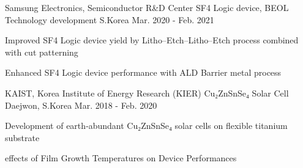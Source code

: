 \begin{cventries}
  \cventry
    {Samsung Electronics, Semiconductor R\&D Center} %
    {SF4 Logic device, BEOL Technology development} %
    {S.Korea} %
    {Mar. 2020 - Feb. 2021} %
    {
      \begin{cvitems} %
        \item {Improved SF4 Logic device yield by Litho–Etch–Litho–Etch process combined with cut patterning}
        \item {Enhanced SF4 Logic device performance with ALD Barrier metal process}
      \end{cvitems}
    }

  \cventry
    {KAIST, Korea Institute of Energy Research (KIER)} %
    {Cu₂ZnSnSe₄ Solar Cell} %
    {Daejwon, S.Korea} %
    {Mar. 2018 - Feb. 2020} %
    {
      \begin{cvitems} %
        \item {Development of earth‑abundant Cu₂ZnSnSe₄ solar cells on flexible titanium substrate}
        \item {effects of Film Growth Temperatures on Device Performances}
      \end{cvitems}
    }



\end{cventries}
